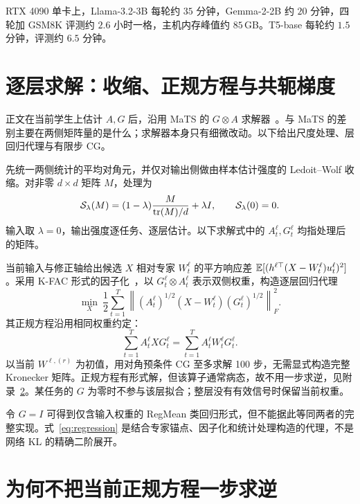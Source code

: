 RTX 4090 单卡上，Llama-3.2-3B 每轮约 $35$ 分钟，Gemma-2-2B 约 $20$ 分钟，四轮加 GSM8K 评测约 $2.6$ 小时一格，主机内存峰值约 $85$\,GB。T5-base 每轮约 $1.5$ 分钟，评测约 $6.5$ 分钟。

\newpage


\newpage
\section{逐层求解：收缩、正规方程与共轭梯度}
\label{app:solver}

正文在当前学生上估计 $A,G$ 后，沿用 MaTS 的 $G\otimes A$ 求解器~\citep{tam2024mats}。与 MaTS 的差别主要在两侧矩阵量的是什么；求解器本身只有细微改动。以下给出尺度处理、层回归代理与有限步 CG。

先统一两侧统计的平均对角元，并仅对输出侧做由样本估计强度的 Ledoit--Wolf 收缩。对非零 $d\times d$ 矩阵 $M$，处理为
\begin{equation}
 \mathcal S_\lambda(M)=(1-\lambda)\frac{M}{\mathrm{tr}(M)/d}+\lambda I,
 \qquad\mathcal S_\lambda(0)=0.
 \label{eq:shrink}
\end{equation}
输入取 $\lambda=0$，输出强度逐任务、逐层估计。以下求解式中的 $A_t^\ell,G_t^\ell$ 均指处理后的矩阵。

当前输入与修正轴给出候选 $X$ 相对专家 $W_t^\ell$ 的平方响应差
$\mathbb E[(h^{\ell\top}(X-W_t^\ell)u_t^\ell)^2]$。采用 K-FAC 形式的因子化~\citep{martens2015kfac}，以 $G_t^\ell\otimes A_t^\ell$ 表示双侧权重，构造逐层回归代理
\begin{equation}
 \min_X\ \frac12\sum_{t=1}^T
 \left\|(A_t^\ell)^{1/2}(X-W_t^\ell)(G_t^\ell)^{1/2}\right\|_F^2.
 \label{eq:regression}
\end{equation}
其正规方程沿用相同权重约定：
\begin{equation}
 \sum_{t=1}^T A_t^\ell X G_t^\ell
 =\sum_{t=1}^T A_t^\ell W_t^\ell G_t^\ell.
 \label{eq:normal-equation}
\end{equation}
以当前 $W^{\ell,(r)}$ 为初值，用对角预条件 CG 至多求解 100 步，无需显式构造完整 Kronecker 矩阵。正规方程有形式解，但该算子通常病态，故不用一步求逆，见附录~\ref{app:onestep}。某任务的 $G$ 为零时不参与该层拟合；整层没有有效信号时保留当前权重。

令 $G=I$ 可得到仅含输入权重的 RegMean 类回归形式，但不能据此等同两者的完整实现。式~\eqref{eq:regression} 是结合专家锚点、因子化和统计处理构造的代理，不是网络 KL 的精确二阶展开。

\newpage
\section{为何不把当前正规方程一步求逆}
\label{app:onestep}

